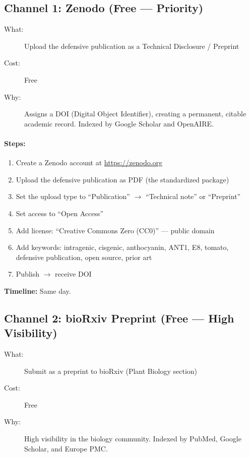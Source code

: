 \documentclass[12pt,a4paper]{article}
\begin{document}
\subsection{Channel 1: Zenodo (Free --- Priority)}

\begin{description}
  \item[What:] Upload the defensive publication as a Technical Disclosure / Preprint
  \item[Cost:] Free
  \item[Why:] Assigns a DOI (Digital Object Identifier), creating a permanent, citable academic record. Indexed by Google Scholar and OpenAIRE.
\end{description}

\paragraph{Steps:}
\begin{enumerate}
  \item Create a Zenodo account at \url{https://zenodo.org}
  \item Upload the defensive publication as PDF (the standardized package)
  \item Set the upload type to ``Publication'' $\rightarrow$ ``Technical note'' or ``Preprint''
  \item Set access to ``Open Access''
  \item Add license: ``Creative Commons Zero (CC0)'' --- public domain
  \item Add keywords: intragenic, cisgenic, anthocyanin, ANT1, E8, tomato, defensive publication, open source, prior art
  \item Publish $\rightarrow$ receive DOI
\end{enumerate}

\noindent\textbf{Timeline:} Same day.

\subsection{Channel 2: bioRxiv Preprint (Free --- High Visibility)}

\begin{description}
  \item[What:] Submit as a preprint to bioRxiv (Plant Biology section)
  \item[Cost:] Free
  \item[Why:] High visibility in the biology community. Indexed by PubMed, Google Scholar, and Europe PMC.
\end{description}
\end{document}
